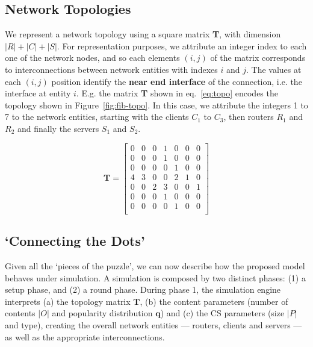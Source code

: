 \subsection{Network Topologies}
\label{subsec:meth-topologies}

We represent a network topology using a square matrix \textbf{T}, 
with dimension $|R|+|C|+|S|$. For representation purposes, we attribute an 
integer index to each one of the network nodes, and so each elements $(i,j)$ of the 
matrix corresponds to interconnections between network entities with indexes $i$ and $j$. The 
values at each $(i,j)$ position identify the \textbf{near end interface} of the 
connection, i.e. the interface at entity $i$. E.g. the matrix \textbf{T} shown 
in eq.~\ref{eq:topo} encodes the topology shown in Figure~\ref{fig:fib-topo}. In this case, 
we attribute the integers 1 to 7 to the network entities, starting with the 
clients $C_1$ to $C_3$, then routers $R_1$ and $R_2$ and 
finally the servers $S_1$ and $S_2$.

\begin{equation}
\textbf{T} = \begin{bmatrix} 
                0 & 0 & 0 & 1 & 0 & 0 & 0               \\ 
                0 & 0 & 0 & 1 & 0 & 0 & 0               \\ 
                0 & 0 & 0 & 0 & 1 & 0 & 0               \\ 
                4 & 3 & 0 & 0 & 2 & 1 & 0               \\ 
                0 & 0 & 2 & 3 & 0 & 0 & 1               \\ 
                0 & 0 & 0 & 1 & 0 & 0 & 0               \\ 
                0 & 0 & 0 & 0 & 1 & 0 & 0               \\ \end{bmatrix}
    \label{eq:topo}
\end{equation}

\subsection{`Connecting the Dots'}
\label{subsec:meth-conn-dots}

Given all the `pieces of the puzzle', we can now describe how the proposed model 
behaves under simulation. A simulation is composed by two distinct phases: (1) 
a setup phase, and (2) a round phase. During phase 1, the simulation engine 
interprets (a) the topology matrix $\textbf{T}$, (b) the content parameters (number of 
contents $|O|$ and popularity distribution $\textbf{q}$) and (c) the CS parameters 
(size $|P|$ and type), creating the overall network entities --- routers, clients and 
servers --- as well as the appropriate interconnections.\shortvertbreak

